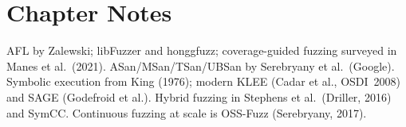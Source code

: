 \section*{Chapter Notes}
{\sloppy
AFL by Zalewski; libFuzzer and honggfuzz; coverage-guided fuzzing surveyed in Manes et al.~(2021). ASan/MSan/TSan/UBSan by Serebryany et al.\ (Google). Symbolic execution from King (1976); modern KLEE (Cadar et al., OSDI~2008) and SAGE (Godefroid et al.). Hybrid fuzzing in Stephens et al.~(Driller, 2016) and SymCC. Continuous fuzzing at scale is OSS-Fuzz (Serebryany, 2017).
\par}

